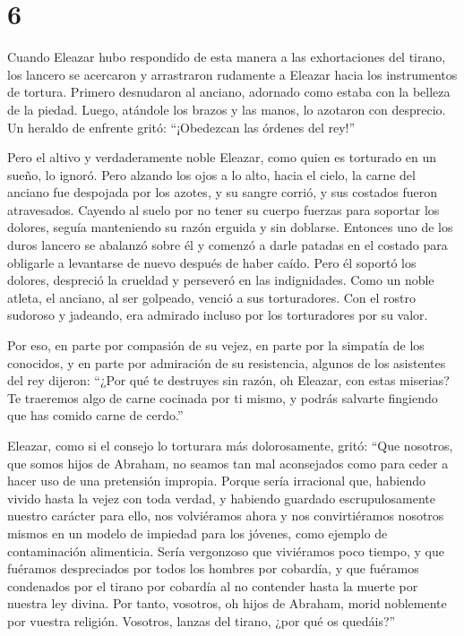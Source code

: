 \hypertarget{section-5}{%
\section{6}\label{section-5}}

 Cuando Eleazar hubo respondido de esta manera a las
exhortaciones del tirano, los lancero se acercaron y arrastraron
rudamente a Eleazar hacia los instrumentos de tortura. 
Primero desnudaron al anciano, adornado como estaba con la belleza de la
piedad.  Luego, atándole los brazos y las manos, lo
azotaron con desprecio.  Un heraldo de enfrente gritó:
``¡Obedezcan las órdenes del rey!''

 Pero el altivo y verdaderamente noble Eleazar, como quien
es torturado en un sueño, lo ignoró.  Pero alzando los
ojos a lo alto, hacia el cielo, la carne del anciano fue despojada por
los azotes, y su sangre corrió, y sus costados fueron atravesados.
 Cayendo al suelo por no tener su cuerpo fuerzas para
soportar los dolores, seguía manteniendo su razón erguida y sin
doblarse.  Entonces uno de los duros lancero se abalanzó
sobre él y comenzó a darle patadas en el costado para obligarle a
levantarse de nuevo después de haber caído.  Pero él
soportó los dolores, despreció la crueldad y perseveró en las
indignidades.  Como un noble atleta, el anciano, al ser
golpeado, venció a sus torturadores.  Con el rostro
sudoroso y jadeando, era admirado incluso por los torturadores por su
valor.

 Por eso, en parte por compasión de su vejez,
 en parte por la simpatía de los conocidos, y en parte
por admiración de su resistencia, algunos de los asistentes del rey
dijeron:  ``¿Por qué te destruyes sin razón, oh Eleazar,
con estas miserias?  Te traeremos algo de carne cocinada
por ti mismo, y podrás salvarte fingiendo que has comido carne de
cerdo.''

 Eleazar, como si el consejo lo torturara más
dolorosamente, gritó:  ``Que nosotros, que somos hijos de
Abraham, no seamos tan mal aconsejados como para ceder a hacer uso de
una pretensión impropia.  Porque sería irracional que,
habiendo vivido hasta la vejez con toda verdad, y habiendo guardado
escrupulosamente nuestro carácter para ello, nos volviéramos ahora
 y nos convirtiéramos nosotros mismos en un modelo de
impiedad para los jóvenes, como ejemplo de contaminación alimenticia.
 Sería vergonzoso que viviéramos poco tiempo, y que
fuéramos despreciados por todos los hombres por cobardía,
 y que fuéramos condenados por el tirano por cobardía al
no contender hasta la muerte por nuestra ley divina.  Por
tanto, vosotros, oh hijos de Abraham, morid noblemente por vuestra
religión.  Vosotros, lanzas del tirano, ¿por qué os
quedáis?''


